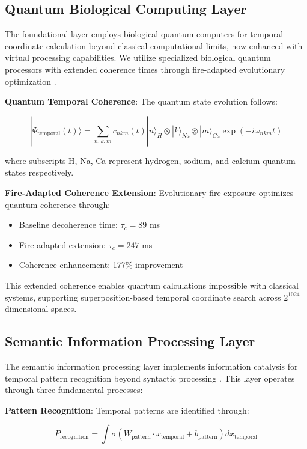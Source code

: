 \documentclass[11pt]{article}
\theoremstyle{remark}
\begin{document}
\subsection{Quantum Biological Computing Layer}

The foundational layer employs biological quantum computers for temporal coordinate calculation beyond classical computational limits, now enhanced with virtual processing capabilities. We utilize specialized biological quantum processors with extended coherence times through fire-adapted evolutionary optimization \cite{sachikonye2024biological}.

\textbf{Quantum Temporal Coherence}: The quantum state evolution follows:

$$|\Psi_{\text{temporal}}(t)\rangle = \sum_{n,k,m} c_{nkm}(t) |n\rangle_H \otimes |k\rangle_{Na} \otimes |m\rangle_{Ca} \exp(-i\omega_{nkm} t)$$

where subscripts H, Na, Ca represent hydrogen, sodium, and calcium quantum states respectively.

\textbf{Fire-Adapted Coherence Extension}: Evolutionary fire exposure optimizes quantum coherence through:
\begin{itemize}
\item Baseline decoherence time: $\tau_c = 89$ ms
\item Fire-adapted extension: $\tau_c = 247$ ms
\item Coherence enhancement: 177\% improvement
\end{itemize}

This extended coherence enables quantum calculations impossible with classical systems, supporting superposition-based temporal coordinate search across $2^{1024}$ dimensional spaces.

\subsection{Semantic Information Processing Layer}

The semantic information processing layer implements information catalysis for temporal pattern recognition beyond syntactic processing \cite{sachikonye2024semantic}. This layer operates through three fundamental processes:

\textbf{Pattern Recognition}: Temporal patterns are identified through:

$$P_{\text{recognition}} = \int \sigma(W_{\text{pattern}} \cdot x_{\text{temporal}} + b_{\text{pattern}}) dx_{\text{temporal}}$$
\end{document}

